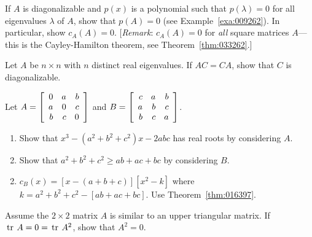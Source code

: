 \begin{multicols}{2}
\begin{ex}
If $A$ is diagonalizable and $p(x)$ is a polynomial such that $p(\lambda) = 0$ for all eigenvalues $\lambda$ of $A$, show that $p(A) = 0$ (see Example~\ref{exa:009262}). In particular, show $c_{A}(A) = 0$. [\textit{Remark}: $c_{A}(A) = 0$ for \textit{all} square matrices $A$---this is the Cayley-Hamilton theorem, see Theorem~\ref{thm:033262}.]
\end{ex}

\begin{ex}
Let $A$ be $n \times n$ with $n$ distinct real eigenvalues. If $AC = CA$, show that $C$ is diagonalizable.
\end{ex}

\begin{ex}
Let $A = \left[ \begin{array}{rrr}
0 & a & b \\
a & 0 & c \\
b & c & 0	
\end{array} \right]$ and \newline $B = 
\left[ \begin{array}{rrr}
c & a & b \\
a & b & c \\
b & c & a
\end{array} \right]$.

\begin{enumerate}[label={\alph*.}]
\item Show that $x^{3} - (a^{2} + b^{2} + c^{2})x - 2abc$ has real roots by considering $A$.

\item Show that $a^{2} + b^{2} + c^{2} \geq ab + ac + bc$ by considering $B$.

\end{enumerate}
\begin{sol}
\begin{enumerate}[label={\alph*.}]
\setcounter{enumi}{1}
\item  $c_{B}(x) = [x - (a + b + c)][x^{2} - k]$ where $k = a^{2} + b^{2} + c^{2} - [ab + ac + bc]$. Use Theorem~\ref{thm:016397}.

\end{enumerate}
\end{sol}
\end{ex}

\begin{ex}
Assume the $2 \times 2$ matrix $A$ is similar to an upper triangular matrix. If $\thinspace\operatorname{tr\medspace} A = 0 = \thinspace\operatorname{tr\medspace} A^{2}$, show that $A^{2} = 0$.
\end{ex}


\end{multicols}

